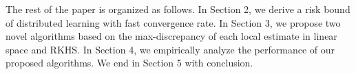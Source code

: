 \documentclass{article}
\newcommand{\argmin}{\operatornamewithlimits{arg\,min}}
\begin{document}
The rest of the paper is organized as follows.
In Section 2, we derive a risk bound of distributed learning with fast convergence rate.
In Section 3, we  propose two novel algorithms based on the max-discrepancy of each local estimate in linear space and RKHS.
In Section 4, we empirically analyze the performance of our proposed algorithms.
We end in Section 5 with conclusion.


%
%
%
\end{document}
